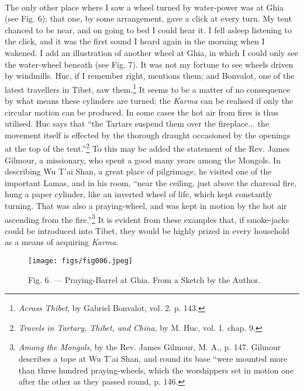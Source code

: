 \documentclass[a4paper, 11pt, oneside, polutonikogreek, english]{article}
\begin{document}
\paragraph{}
The only other place where I saw a wheel turned by water-power was at Ghia (see Fig. 6); that one, by some arrangement, gave a click at every turn. My tent chanced to be near, and on going to bed I could hear it. I fell asleep listening to the click, and it was the first sound I heard again in the morning when I wakened. I add an illustration of another wheel at Ghia, in which I could only see the water-wheel beneath (see Fig. 7). It was not my fortune to see wheels driven by windmills. Huc, if I remember right, mentions them; and Bonvalot, one of the latest travellers in Tibet, saw them.\footnote{\emph{Across Thibet}, by Gabriel Bonvalot, vol. 2. p. 143.} It seems to be a matter of no consequence by what means these cylinders are turned; the \emph{Karma} can be realised if only the circular motion can be produced. In some cases the hot air from fires is thus utilised. Huc says that ``the Tartars suspend them over the fireplace... the movement itself is effected by the thorough draught occasioned by the openings at the top of the tent.''\footnote{\emph{Travels in Tartary, Thibet, and China}, by M. Huc, vol. 1. chap. 9.} To this may be added the statement of the Rev. James Gilmour, a missionary, who spent a good many years among the Mongols. In describing Wu T'ai Shan, a great place of pilgrimage, he visited one of the important Lamas, and in his room, ``near the ceiling, just above the charcoal fire, hung a paper cylinder, like an inverted wheel of life, which kept constantly turning. That was also a praying-wheel, and was kept in motion by the hot air ascending from the fire.''\footnote{\emph{Among the Mongols}, by the Rev. James Gilmour, M. A., p. 147. Gilmour describes a tope at Wu T'ai Shan, and round its base ``were mounted more than three hundred praying-wheels, which the worshippers set in motion one after the other as they passed round, p. 146.} It is evident from these examples that, if smoke-jacks could be introduced into Tibet, they would be highly prized in every household as a means of acquiring \emph{Karma}.

\begin{figure}[H]
\centering
\texttt{[image: figs/fig006.jpeg]}
\caption[Fig. 6. --- Praying-Barrel at Ghia.]{Fig. 6. --- Praying-Barrel at Ghia. From a Sketch by the Author.}
\end{figure}
\end{document}
